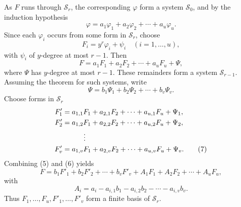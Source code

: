 \documentclass[11pt]{article}
\begin{document}
As $F$ runs through $\mathcal S_r$, the corresponding $\varphi$ form a system $\mathcal S_0$, and by the induction hypothesis
\begin{equation}
\varphi=a_1\varphi_1+a_2\varphi_2+\cdots+a_u\varphi_u.
\tag{3}
\end{equation}
Since each $\varphi_i$ occurs from some form in $\mathcal S_r$, choose
\begin{equation}
F_i=y^r\varphi_i+\psi_i
\quad(i=1,\ldots,u),
\tag{4}
\end{equation}
with $\psi_i$ of $y$-degree at most $r-1$. Then
\begin{equation}
F=a_1F_1+a_2F_2+\cdots+a_uF_u+
\Psi,
\tag{5}
\end{equation}
where $\Psi$ has $y$-degree at most $r-1$. These remainders form a system $\mathcal S_{r-1}$. Assuming the theorem for such systems, write
\begin{equation}
\Psi=b_1\Psi_1+b_2\Psi_2+\cdots+b_v\Psi_v.
\tag{6}
\end{equation}
Choose forms in $\mathcal S_r$
\begin{align}
F'_1&=a_{1,1}F_1+a_{2,1}F_2+\cdots+a_{u,1}F_u+\Psi_1,\notag\\
F'_2&=a_{1,2}F_1+a_{2,2}F_2+\cdots+a_{u,2}F_u+\Psi_2,\notag\\
&\hspace{3em}\vdots\notag\\
F'_v&=a_{1,v}F_1+a_{2,v}F_2+\cdots+a_{u,v}F_u+\Psi_v.
\tag{7}
\end{align}
Combining (5) and (6) yields
\begin{equation}
F=b_1F'_1+b_2F'_2+\cdots+b_vF'_v+A_1F_1+A_2F_2+\cdots+A_uF_u,
\tag{8}
\end{equation}
with
\begin{equation}
A_i=a_i-a_{i,1}b_1-a_{i,2}b_2-\cdots-a_{i,v}b_v.
\tag{9}
\end{equation}
Thus $F_1,\ldots,F_u,F'_1,\ldots,F'_v$ form a finite basis of $\mathcal S_r$.
\end{document}
